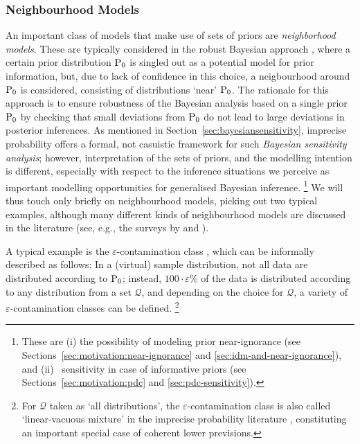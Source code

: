 \subsubsection{Neighbourhood Models}
\label{sec:alternatives:neighbourhood}

An important class of models that make use of sets of priors are \emph{neighborhood models}.
These are typically considered in the robust Bayesian approach \parencite[see, e.g.,][]{1994:berger,2000:rios},
where a certain prior distribution $\operatorname{P}_0$ is singled out as a potential model for prior information,
but, due to lack of confidence in this choice, a neigbourhood around $\operatorname{P}_0$ is considered,
consisting of distributions `near' $\operatorname{P}_0$.
The rationale for this approach is to ensure robustness of the Bayesian analysis based on a single prior $\operatorname{P}_0$
by checking that small deviations from $\operatorname{P}_0$ do not lead to large deviations in posterior inferences.
As mentioned in Section~\ref{sec:bayesiansensitivity},
imprecise probability offers a formal, not casuistic framework for such \emph{Bayesian sensitivity analysis};
however, interpretation of the sets of priors, and the modelling intention is different,
especially with respect to the inference situations we perceive as important modelling opportunities
for generalised Bayesian inference.%
\footnote{These are (i) the possibility of modeling prior near-ignorance
(see Sections~\ref{sec:motivation:near-ignorance} and \ref{sec:idm-and-near-ignorance}),
and (ii) \pdc\ sensitivity in case of informative priors
(see Sections~\ref{sec:motivation:pdc} and \ref{sec:pdc-sensitivity}).}
We will thus touch only briefly on neighbourhood models,
picking out two typical examples,
although many different kinds of neighbourhood models are discussed in the literature
(see, e.g., the surveys by \textcite{2000:bergerinsuaruggeri} and \textcite{2005:ruggeri}).

A typical example is the $\varepsilon$-contamination class \parencite[see, e.g.,][\S 4.3.2]{1994:berger},
which can be informally described as follows:
In a (virtual) sample distribution,
not all data are distributed according to $\operatorname{P}_0$;
instead, %
$100\cdot\varepsilon$\% of the data is distributed according to any distribution from a set $\mathcal{Q}$, %
and depending on the choice for $\mathcal{Q}$, %
a variety of $\varepsilon$-contamination classes can be defined.%
\footnote{For $\mathcal{Q}$ taken as `all distributions',
the $\varepsilon$-contamination class is also called `linear-vacuous mixture'
in the imprecise probability literature \parencite[e.g.,][\S 7.3]{itip-special},
constituting an important special case of coherent lower previsions.}

